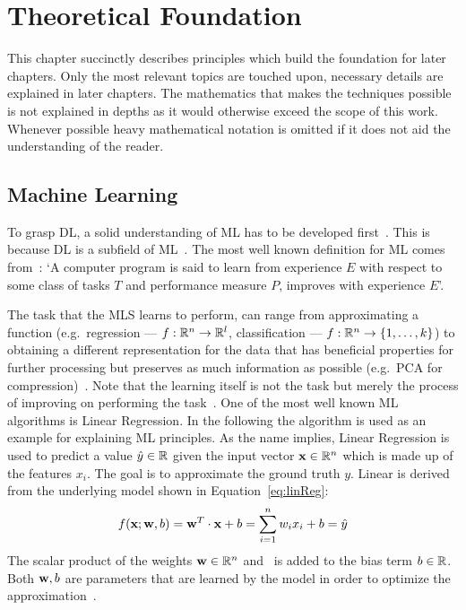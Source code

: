 \cleardoublepage%
\chapter{Theoretical Foundation}\label{ch:theoretical}
This chapter succinctly describes principles which build the foundation for later chapters.
Only the most relevant topics are touched upon, necessary details are explained in later chapters.
The mathematics that makes the techniques possible is not explained in depths as it would otherwise
exceed the scope of this work.
Whenever possible heavy mathematical notation is omitted if it does not aid the understanding of the
reader.

\section{Machine Learning}
To grasp \ac{DL}, a solid understanding of \ac{ML} has to be developed
first~\citep{goodfellow_deep_2016}.
This is because \ac{DL} is a subfield of \ac{ML}~\citep{chauhan_review_2018}.
The most well known definition for \ac{ML} comes from~\cite{mitchell_machine_1997}:
`A computer program is said to learn from experience $E$ with respect to some class of tasks $T$
and performance measure $P$, improves with experience $E$'.

The task that the \ac{MLS} learns to perform, can range from approximating a function
(e.g.\ regression --- $f:\mathbb{R}^n \rightarrow \mathbb{R}^l$, classification ---
$f:\mathbb{R}^n \rightarrow \{1,\ldots,k\}$) to obtaining a different representation for the data that
has beneficial properties for further processing but preserves as much information as possible
(e.g.\ PCA for compression)~\citep{goodfellow_deep_2016}.
Note that the learning itself is not the task but merely the process of improving on performing the
task~\citep{goodfellow_deep_2016}.
One of the most well known \ac{ML} algorithms is Linear Regression.
In the following the algorithm is used as an example for explaining \ac{ML} principles.
As the name implies, Linear Regression is used to predict a value $\hat{y}\in\mathbb{R}$ given the input vector
$\textbf{x}\in\mathbb{R}^n$ which is made up of the features $x_i$.
The goal is to approximate the ground truth $y$.
Linear is derived from the underlying model shown in Equation~\ref{eq:linReg}:
\begin{equation}\label{eq:linReg}
    f(\textbf{x};\textbf{w},b) = \textbf{w}^{T} \cdot \textbf{x} + b = \sum_{i=1}^{n} w_i x_i + b = \hat{y}
\end{equation}
The scalar product of the weights $\textbf{w}\in\mathbb{R}^n$ and \x\ is added to the bias term $b\in\mathbb{R}$.
Both $\textbf{w},b$ are parameters that are learned by the model in order to optimize the
approximation~\citep{goodfellow_deep_2016}.

